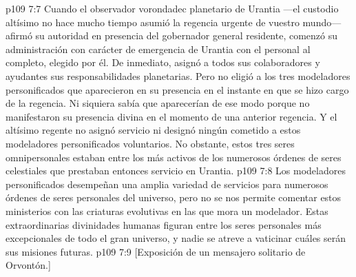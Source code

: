 \vs p109 7:7 \pc Cuando el observador vorondadec planetario de Urantia ---el custodio altísimo no hace mucho tiempo asumió la regencia urgente de vuestro mundo--- afirmó su autoridad en presencia del gobernador general residente, comenzó su administración con carácter de emergencia de Urantia con el personal al completo, elegido por él. De inmediato, asignó a todos sus colaboradores y ayudantes sus responsabilidades planetarias. Pero no eligió a los tres modeladores personificados que aparecieron en su presencia en el instante en que se hizo cargo de la regencia. Ni siquiera sabía que aparecerían de ese modo porque no manifestaron su presencia divina en el momento de una anterior regencia. Y el altísimo regente no asignó servicio ni designó ningún cometido a estos modeladores personificados voluntarios. No obstante, estos tres seres omnipersonales estaban entre los más activos de los numerosos órdenes de seres celestiales que prestaban entonces servicio en Urantia.
\vs p109 7:8 \pc Los modeladores personificados desempeñan una amplia variedad de servicios para numerosos órdenes de seres personales del universo, pero no se nos permite comentar estos ministerios con las criaturas evolutivas en las que mora un modelador. Estas extraordinarias divinidades humanas figuran entre los seres personales más excepcionales de todo el gran universo, y nadie se atreve a vaticinar cuáles serán sus misiones futuras.
\vsetoff
\vs p109 7:9 [Exposición de un mensajero solitario de Orvontón.]
